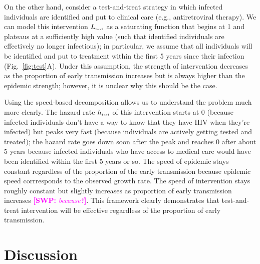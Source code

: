 \documentclass{article}\usepackage[]{graphicx}\usepackage[]{color}
\newcommand{\comment}[3]{\textcolor{#1}{\textbf{[#2: }\textit{#3}\textbf{]}}}
\newcommand{\swp}[1]{\comment{magenta}{SWP}{#1}}
\newcommand{\tsub}[2]{#1_{{\textrm{\tiny #2}}}}
\newcommand{\figref}[1]{Fig.~\ref{fig:#1}}
\begin{document}
On the other hand, consider a test-and-treat strategy in which infected individuals are identified and put to clinical care (e.g., antiretroviral therapy).
We can model this intervention $\tsub{L}{test}$ as a saturating function that begins at 1 and plateaus at a sufficiently high value (such that identified individuals are effectively no longer infectious);
in particular, we assume that all individuals will be identified and put to treatment within the first 5 years since their infection (\figref{test}A).
Under this assumption, the strength of intervention decreases as the proportion of early transmission increases but is always higher than the epidemic strength; 
however, it is unclear why this should be the case.

Using the speed-based decomposition allows us to understand the problem much more clearly.
The hazard rate $\tsub{h}{test}$ of this intervention starts at 0 (because infected individuals don't have a way to know that they have HIV when they're infected) but peaks very fast (because individuals are actively getting tested and treated); 
the hazard rate goes down soon after the peak and reaches 0 after about 5 years because infected individuals who have access to medical care would have been identified within the first 5 years or so.
The speed of epidemic stays constant regardless of the proportion of the early transmission because epidemic speed corrresponds to the observed growth rate.
The speed of intervention stays roughly constant but slightly increases as proportion of early transmission increases \swp{because?}.
This framework clearly demonstrates that test-and-treat intervention will be effective regardless of the proportion of early transmission.

\section{Discussion}







\end{document}
